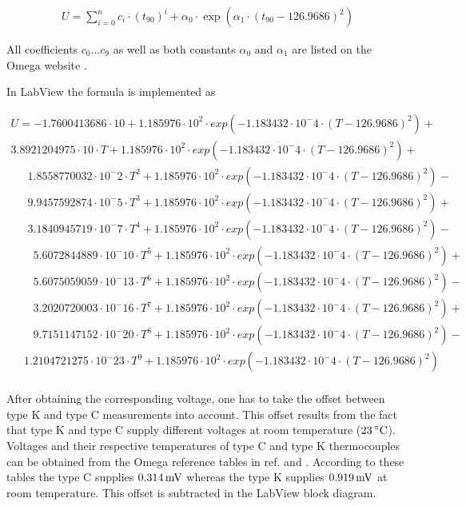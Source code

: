 \documentclass[parskip,12pt,headsepline,a4paper] {scrbook}
\begin{document}
\begin{align}  \label{direct-polynomial}
U = \sum\limits_{i=0}^n c_i \cdot (t_{90})^i + \alpha_0 \cdot \exp(\alpha_1 \cdot (t_{90} - 126.9686)^2)
\end{align}

All coefficients $c_0$...$c_9$ as well as both constants $\alpha_0$ and $\alpha_1$ are listed on the Omega website \cite{omega-polynomials}.

In LabView the formula is implemented as

\begin{multline}  \label{implemented-polynomial}
U = -1.7600413686 \cdot 10 + 1.185976 \cdot 10^2 \cdot exp(-1.183432 \cdot 10^-4 \cdot (T-126.9686)^2) + \\
    3.8921204975 \cdot 10 \cdot T + 1.185976 \cdot 10^2 \cdot exp(-1.183432 \cdot 10^-4 \cdot (T-126.9686)^2) + \\
    \quad \,\,\,1.8558770032 \cdot 10^-2 \cdot T^2 + 1.185976 \cdot 10^2 \cdot exp(-1.183432 \cdot 10^-4 \cdot (T-126.9686)^2) - \\
    \quad \,\,\,9.9457592874 \cdot 10^-5 \cdot T^3 + 1.185976 \cdot 10^2 \cdot exp(-1.183432 \cdot 10^-4 \cdot (T-126.9686)^2) + \\
    \quad \,\,\,3.1840945719 \cdot 10^-7 \cdot T^4 + 1.185976 \cdot 10^2 \cdot exp(-1.183432 \cdot 10^-4 \cdot (T-126.9686)^2) - \\
    \quad \quad5.6072844889 \cdot 10^-10 \cdot T^5 + 1.185976 \cdot 10^2 \cdot exp(-1.183432 \cdot 10^-4 \cdot (T-126.9686)^2) + \\
    \quad \quad5.6075059059 \cdot 10^-13 \cdot T^6 + 1.185976 \cdot 10^2 \cdot exp(-1.183432 \cdot 10^-4 \cdot (T-126.9686)^2) - \\
    \quad \quad3.2020720003 \cdot 10^-16 \cdot T^7 + 1.185976 \cdot 10^2 \cdot exp(-1.183432 \cdot 10^-4 \cdot (T-126.9686)^2) + \\
    \quad \quad9.7151147152 \cdot 10^-20 \cdot T^8 + 1.185976 \cdot 10^2 \cdot exp(-1.183432 \cdot 10^-4 \cdot (T-126.9686)^2) - \\
    \quad \,1.2104721275 \cdot 10^-23 \cdot T^9 + 1.185976 \cdot 10^2 \cdot exp(-1.183432 \cdot 10^-4 \cdot (T-126.9686)^2) \\
\end{multline}

After obtaining the corresponding voltage, one has to take the offset between type K and type C measurements into account. This offset results from the fact that type K and type C supply different voltages at room temperature ($\unit[23]{^\circ C}$). Voltages and their respective temperatures of type C and type K thermocouples can be obtained from the Omega reference tables in ref. \cite{ref-typec} and \cite{ref-typek}. According to these tables the type C supplies $\unit[0.314]{mV}$ whereas the type K supplies $\unit[0.919]{mV}$ at room temperature. This offset is subtracted in the LabView block diagram.
\end{document}
